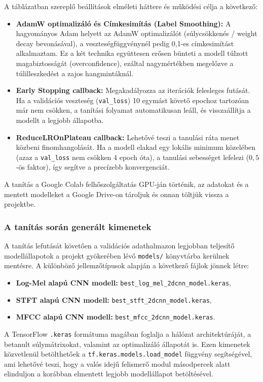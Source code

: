 A táblázatban szereplő beállítások elméleti háttere és működési célja a következő:
\begin{itemize}
  \item \textbf{AdamW optimalizáló és Címkesimítás (Label Smoothing):} A hagyományos Adam helyett az AdamW optimalizálót (súlycsökkenés / weight decay bevonásával), a veszteségfüggvénynél pedig 0,1-es címkesimítást alkalmaztam. Ez a két technika együttesen erősen bünteti a modell túlzott magabiztosságát (overconfidence), ezáltal nagymértékben megelőzve a túlilleszkedést a zajos hangmintáknál.
  \item \textbf{Early Stopping callback:} Megakadályozza az iterációk felesleges futását. Ha a validációs veszteség (\texttt{val\_loss}) 10 egymást követő epochoz tartozóan már nem csökken, a tanítási folyamat automatikusan leáll, és visszaállítja a modellt a legjobb állapotba.
  \item \textbf{ReduceLROnPlateau callback:} Lehetővé teszi a tanulási ráta menet közbeni finomhangolását. Ha a modell elakad egy lokális minimum közelében (azaz a \texttt{val\_loss} nem csökken 4 epoch óta), a tanulási sebességet lefelezi ($0{,}5$-ös faktor), így segítve a precízebb konvergenciát.
\end{itemize}

A tanítás a Google Colab felhőszolgáltatás GPU-ján történik, az adatokat és a mentett modelleket a Google Drive-on tároljuk és onnan töltjük vissza a projektbe.

\subsubsection{A tanítás során generált kimenetek}
\label{subsubsec:model_outputs}

A tanítás lefutását követően a validációs adathalmazon legjobban teljesítő modellállapotok a projekt gyökerében lévő \texttt{models/} könyvtárba kerülnek mentésre. A különböző jellemzőtípusok alapján a következő fájlok jönnek létre:
\begin{itemize}
  \item \textbf{Log-Mel alapú CNN modell:} \texttt{best\_log\_mel\_2dcnn\_model.keras},
  \item \textbf{STFT alapú CNN modell:} \texttt{best\_stft\_2dcnn\_model.keras},
  \item \textbf{MFCC alapú CNN modell:} \texttt{best\_mfcc\_2dcnn\_model.keras}.
\end{itemize}
A TensorFlow \texttt{.keras} formátuma magában foglalja a hálózat architektúráját, a betanult súlymátrixokat, valamint az optimalizáló állapotát is. Ezen kimenetek közvetlenül betölthetőek a \texttt{tf.keras.models.load\_model} függvény segítségével, ami lehetővé teszi, hogy a valós idejű felismerő modul másodpercek alatt elinduljon a korábban elmentett legjobb modellállapot betöltésével.


